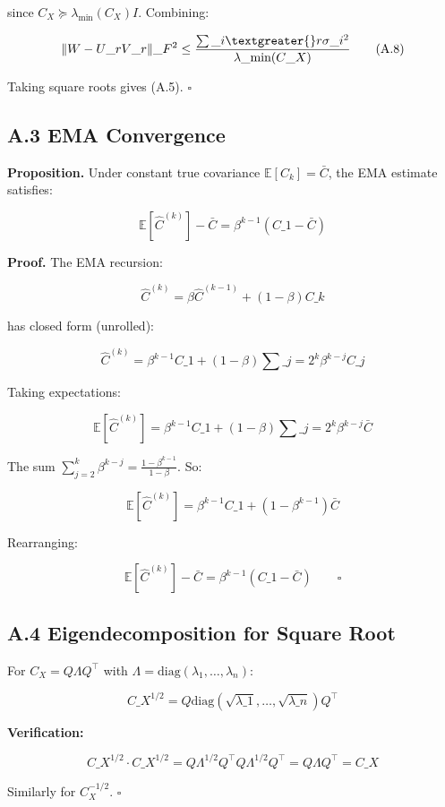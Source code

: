 since $C_X \succeq \lambda_\text{min}(C_X) I$. Combining:

\[
\|W - U\_r V\_r\|\_F^2 \leq \frac{\sum\_{i \textgreater{} r} \sigma\_i^2}{\lambda\_\text{min}(C\_X)}
\tag{A.8}
\]

Taking square roots gives (A.5). $\square$

\subsection{A.3 EMA Convergence}

\textbf{Proposition.} Under constant true covariance $\mathbb{E}[C_k] = \bar{C}$, 
the EMA estimate satisfies:

\[
\mathbb{E}[\hat{C}^{(k)}] - \bar{C} = \beta^{k-1} (C\_1 - \bar{C})
\tag{A.9}
\]

\textbf{Proof.} The EMA recursion:

\[
\hat{C}^{(k)} = \beta \hat{C}^{(k-1)} + (1-\beta) C\_k
\]

has closed form (unrolled):

\[
\hat{C}^{(k)} = \beta^{k-1} C\_1 + (1-\beta) \sum\_{j=2}^{k} \beta^{k-j} C\_j
\]

Taking expectations:

\[
\mathbb{E}[\hat{C}^{(k)}] = \beta^{k-1} C\_1 + (1-\beta) \sum\_{j=2}^{k} \beta^{k-j} \bar{C}
\]

The sum $\sum_{j=2}^{k} \beta^{k-j} = \frac{1 - \beta^{k-1}}{1 - \beta}$. So:

\[
\mathbb{E}[\hat{C}^{(k)}] = \beta^{k-1} C\_1 + (1 - \beta^{k-1}) \bar{C}
\]

Rearranging:

\[
\mathbb{E}[\hat{C}^{(k)}] - \bar{C} = \beta^{k-1} (C\_1 - \bar{C}) \qquad \square
\]

\subsection{A.4 Eigendecomposition for Square Root}

For $C_X = Q \Lambda Q^\top$ with $\Lambda = \mathrm{diag}(\lambda_1, \dots, \lambda_n)$:

\[
C\_X^{1/2} = Q \mathrm{diag}(\sqrt{\lambda\_1}, \dots, \sqrt{\lambda\_n}) Q^\top
\tag{A.10}
\]

\textbf{Verification:}

\[
C\_X^{1/2} \cdot C\_X^{1/2} = Q \Lambda^{1/2} Q^\top Q \Lambda^{1/2} Q^\top = Q \Lambda Q^\top = C\_X
\tag{A.11}
\]

Similarly for $C_X^{-1/2}$. $\square$

